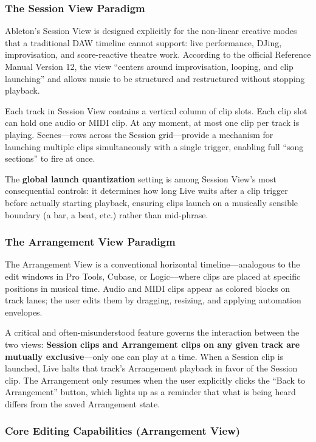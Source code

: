 \documentclass[11pt,letterpaper]{article}
\begin{document}
\subsubsection{The Session View Paradigm}

Ableton's Session View is designed explicitly for the non-linear creative modes that a
traditional DAW timeline cannot support: live performance, DJing, improvisation, and
score-reactive theatre work. According to the official Reference Manual Version 12, the view
``centers around improvisation, looping, and clip launching'' and allows music to be structured
and restructured without stopping playback.

Each track in Session View contains a vertical column of clip slots. Each clip slot can hold
one audio or MIDI clip. At any moment, at most one clip per track is playing. Scenes---rows
across the Session grid---provide a mechanism for launching multiple clips simultaneously with
a single trigger, enabling full ``song sections'' to fire at once.

The \textbf{global launch quantization} setting is among Session View's most consequential
controls: it determines how long Live waits after a clip trigger before actually starting
playback, ensuring clips launch on a musically sensible boundary (a bar, a beat, etc.)
rather than mid-phrase.

\subsubsection{The Arrangement View Paradigm}

The Arrangement View is a conventional horizontal timeline---analogous to the edit windows in
Pro Tools, Cubase, or Logic---where clips are placed at specific positions in musical time.
Audio and MIDI clips appear as colored blocks on track lanes; the user edits them by dragging,
resizing, and applying automation envelopes.

A critical and often-misunderstood feature governs the interaction between the two views:
\textbf{Session clips and Arrangement clips on any given track are mutually exclusive}---only
one can play at a time. When a Session clip is launched, Live halts that track's Arrangement
playback in favor of the Session clip. The Arrangement only resumes when the user explicitly
clicks the ``Back to Arrangement'' button, which lights up as a reminder that what is being
heard differs from the saved Arrangement state.

\subsubsection{Core Editing Capabilities (Arrangement View)}
\end{document}
